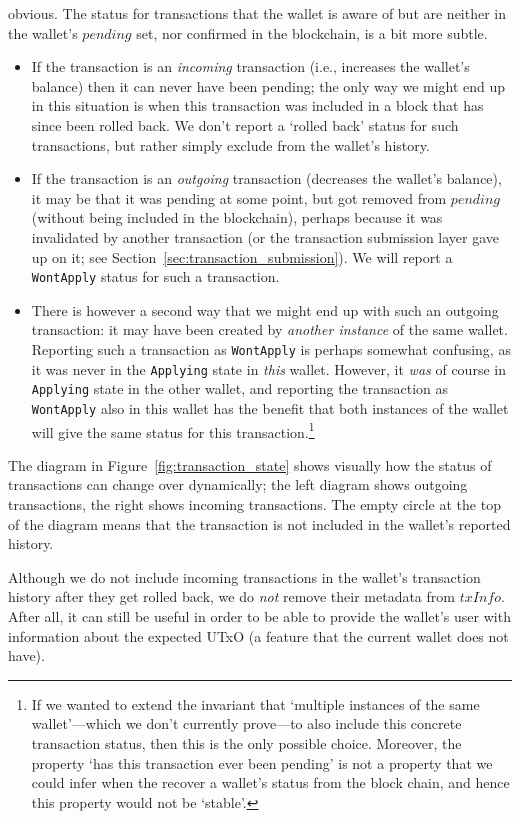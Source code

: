 \documentclass{article}
\numberwithin{equation}{lemma}
\begin{document}
obvious. The status for transactions that the wallet is aware of but
are neither in the wallet's $\mathit{pending}$ set, nor confirmed in the
blockchain, is a bit more subtle.
%
\begin{itemize}
\item If the transaction is an \emph{incoming} transaction (i.e., increases
the wallet's balance) then it can never have been pending; the only way we might
end up in this situation is when this transaction was included in a block that
has since been rolled back. We don't report a `rolled back' status for such
transactions, but rather simply exclude from the wallet's history.
\item If the transaction is an \emph{outgoing} transaction (decreases the
wallet's balance), it may be that it was pending at some point, but got removed
from $\mathit{pending}$ (without being included in the blockchain), perhaps
because it was invalidated by another transaction (or the transaction submission
layer gave up on it; see Section~\ref{sec:transaction_submission}). We will
report a \texttt{WontApply} status for such a transaction.
\item There is however a second way that we might end up with such an
outgoing transaction: it may have been created by \emph{another instance} of the
same wallet. Reporting such a transaction as \texttt{WontApply} is perhaps
somewhat confusing, as it was never in the \texttt{Applying} state in
\emph{this} wallet. However, it \emph{was} of course in \texttt{Applying} state
in the other wallet, and reporting the transaction as \texttt{WontApply} also in
this wallet has the benefit that both instances of the wallet will give the same
status for this transaction.\footnote{If we wanted to extend the invariant that
`multiple instances of the same wallet'---which we don't currently prove---to
also include this concrete transaction status, then this is the only possible
choice. Moreover, the property `has this transaction ever been pending' is not
a property that we could infer when the recover a wallet's status from the block
chain, and hence this property would not be `stable'.}
\end{itemize}
%
The diagram in Figure~\ref{fig:transaction_state} shows visually how the status of
transactions can change over dynamically; the left diagram shows outgoing
transactions, the right shows incoming transactions. The empty circle at the top
of the diagram means that the transaction is not included in the wallet's
reported history.

Although we do not include incoming transactions in the wallet's transaction
history after they get rolled back, we do \emph{not} remove their metadata  from
$\mathit{txInfo}$. After all, it can still be useful in order to be able to
provide the wallet's user with information about the expected UTxO (a feature
that the current wallet does not have).
\end{document}
